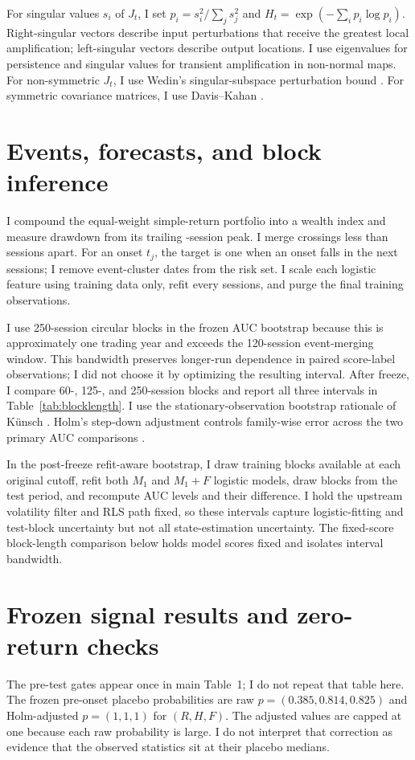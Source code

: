 \documentclass[11pt]{article}
\begin{document}
For singular values $s_i$ of $J_t$, I set $p_i=s_i^2/\sum_js_j^2$ and $H_t=\exp(-\sum_i p_i\log p_i)$. Right-singular vectors describe input perturbations that receive the greatest local amplification; left-singular vectors describe output locations. I use eigenvalues for persistence and singular values for transient amplification in non-normal maps. For non-symmetric $J_t$, I use Wedin's singular-subspace perturbation bound \cite{Wedin}. For symmetric covariance matrices, I use Davis--Kahan \cite{DavisKahan}.

\section{Events, forecasts, and block inference}
I compound the equal-weight simple-return portfolio into a wealth index and measure drawdown from its trailing \PeakWindow-session peak. I merge crossings less than \MergeDays{} sessions apart. For an onset $t_j$, the target is one when an onset falls in the next \ForecastDays{} sessions; I remove event-cluster dates from the risk set. I scale each logistic feature using training data only, refit every \RefitDays{} sessions, and purge the final \PurgeDays{} training observations.

I use 250-session circular blocks in the frozen AUC bootstrap because this is approximately one trading year and exceeds the 120-session event-merging window. This bandwidth preserves longer-run dependence in paired score-label observations; I did not choose it by optimizing the resulting interval. After freeze, I compare 60-, 125-, and 250-session blocks and report all three intervals in Table~\ref{tab:blocklength}. I use the stationary-observation bootstrap rationale of K\"unsch \cite{Kunsch}. Holm's step-down adjustment controls family-wise error across the two primary AUC comparisons \cite{Holm}.

In the post-freeze refit-aware bootstrap, I draw training blocks available at each original cutoff, refit both $M_1$ and $M_1+F$ logistic models, draw blocks from the test period, and recompute AUC levels and their difference. I hold the upstream volatility filter and RLS path fixed, so these intervals capture logistic-fitting and test-block uncertainty but not all state-estimation uncertainty. The fixed-score block-length comparison below holds model scores fixed and isolates interval bandwidth.

\section{Frozen signal results and zero-return checks}
The pre-test gates appear once in main Table~1; I do not repeat that table here.
The frozen pre-onset placebo probabilities are raw $p=(0.385,0.814,0.825)$ and Holm-adjusted $p=(1,1,1)$ for $(R,H,F)$. The adjusted values are capped at one because each raw probability is large. I do not interpret that correction as evidence that the observed statistics sit at their placebo medians.
\end{document}
